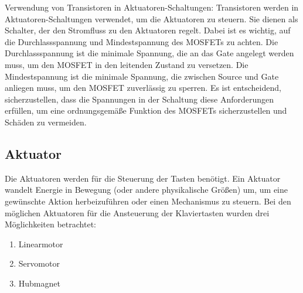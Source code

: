 Verwendung von Transistoren in Aktuatoren-Schaltungen:
Transistoren werden in Aktuatoren-Schaltungen verwendet, um die Aktuatoren
zu steuern. Sie dienen als Schalter, der den Stromfluss zu den Aktuatoren regelt.
Dabei ist es wichtig, auf die Durchlassspannung und Mindestspannung des MOSFETs zu achten. Die Durchlassspannung ist die
minimale Spannung, die an das Gate angelegt werden muss, um den MOSFET in den leitenden Zustand zu versetzen. Die
Mindestspannung ist die minimale Spannung, die zwischen Source und Gate anliegen muss, um den MOSFET zuverlässig zu
sperren.
Es ist entscheidend, sicherzustellen, dass die Spannungen in der Schaltung diese Anforderungen erfüllen, um
eine ordnungsgemäße Funktion des MOSFETs sicherzustellen und Schäden zu vermeiden.

\subsection{Aktuator}\label{subsec:aktuator}
Die Aktuatoren werden für die Steuerung der Tasten benötigt.
Ein Aktuator wandelt Energie in Bewegung (oder andere physikalische Größen) um, um eine gewünschte Aktion herbeizuführen
oder einen Mechanismus zu steuern. \newline %
Bei den möglichen Aktuatoren für die Ansteuerung der Klaviertasten wurden drei Möglichkeiten betrachtet: %
\begin{enumerate}
	\item Linearmotor
	\item Servomotor
	\item Hubmagnet
\end{enumerate}

